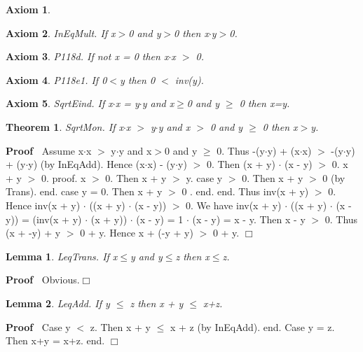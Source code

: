 \documentclass{article}
\newenvironment{forthel}{\begin{leftbar}}{\end{leftbar}}
\newenvironment{proof}{\noindent\textbf{Proof\ }}{\hspace*{\fill}$\Box$\medskip}
\newtheorem{axiom}{Axiom}
\newtheorem{lemma}{Lemma}
\newtheorem{theorem}{Theorem}
\begin{document}
\begin{forthel}
\begin{axiom}
\end{axiom}
\begin{axiom} InEqMult. If x$>$0 and y$>$0 then x$\cdot$y$>$0.

\end{axiom}


\begin{axiom} P118d. If not x = 0 then x$\cdot$x $>$ 0.

\end{axiom}
\begin{axiom} P118e1. If 0$<$y then 0 $<$ inv(y).

\end{axiom}

\begin{axiom} SqrtEind. If x$\cdot$x = y$\cdot$y and x$\geq$0 and y $\geq$ 0 then x=y.

\end{axiom}

\begin{theorem}
 SqrtMon. If x$\cdot$x $>$ y$\cdot$y and x $>$ 0  and y $\geq$ 0 then x$>$y.
\end{theorem}\begin{proof}
	Assume x$\cdot$x $>$ y$\cdot$y and x$>$0 and y $\geq$ 0.
Thus  -(y$\cdot$y) + (x$\cdot$x) $>$ -(y$\cdot$y) + (y$\cdot$y) (by InEqAdd). 
Hence (x$\cdot$x) - (y$\cdot$y) $>$ 0.
Then  (x + y) $\cdot$ (x - y) $>$ 0.
x + y $>$ 0.
proof. 	x $>$ 0. Then x + y $>$ y.
case y $>$ 0. Then x + y $>$ 0 (by Trans). end.
case y = 0. Then x + y  $>$ 0 . end.
end.
Thus inv(x + y) $>$ 0. Hence inv(x + y) $\cdot$ ((x + y) $\cdot$ (x - y)) $>$ 0.
We have inv(x + y) $\cdot$ ((x + y) $\cdot$ (x - y)) 
= (inv(x + y) $\cdot$ (x + y)) $\cdot$ (x - y)
= 1 $\cdot$ (x - y) = x - y.
Then x - y $>$ 0.
Thus (x + -y) + y $>$ 0 + y.
Hence x + (-y + y) $>$ 0 + y.
\end{proof}


\begin{lemma} LeqTrans. If x$\leq$y and y$\leq$z then x$\leq$z.

\end{lemma}
\begin{proof}
 	Obvious.\end{proof}



\begin{lemma} LeqAdd. 	If y $\leq$ z then x + y $\leq$ x+z.

\end{lemma}
\begin{proof}
			Case y $<$ z. Then x + y $\leq$ x + z (by InEqAdd). end.
Case y = z. Then x+y = x+z. end.
\end{proof}



\end{forthel}
\end{document}
